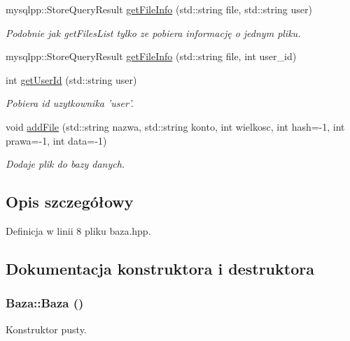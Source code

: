 \begin{CompactItemize}
mysqlpp::StoreQueryResult \hyperlink{class_baza_e4a033a65cb585aa91c15fd8b8fde764}{getFileInfo} (std::string file, std::string user)
\begin{CompactList}\small\item\em Podobnie jak getFilesList tylko ze pobiera informację o jednym pliku. \item\end{CompactList}\item 
mysqlpp::StoreQueryResult \hyperlink{class_baza_1d1cfca062ab3117b2b97281df012823}{getFileInfo} (std::string file, int user\_\-id)
\item 
int \hyperlink{class_baza_65054f08c8fd7c600f6c2fe2c7f61a43}{getUserId} (std::string user)
\begin{CompactList}\small\item\em Pobiera id uzytkownika 'user'. \item\end{CompactList}\item 
void \hyperlink{class_baza_f1bda4acd20e6fd00a35c43638e48956}{addFile} (std::string nazwa, std::string konto, int wielkosc, int hash=-1, int prawa=-1, int data=-1)
\begin{CompactList}\small\item\em Dodaje plik do bazy danych. \item\end{CompactList}\end{CompactItemize}


\subsection{Opis szczegółowy}


Definicja w linii 8 pliku baza.hpp.

\subsection{Dokumentacja konstruktora i destruktora}
\hypertarget{class_baza_8edd83a7fa98b203a1ab58157a1660a4}{
\subsubsection[{Baza}]{\setlength{\rightskip}{0pt plus 5cm}Baza::Baza ()}}
\label{class_baza_8edd83a7fa98b203a1ab58157a1660a4}


Konstruktor pusty. 



